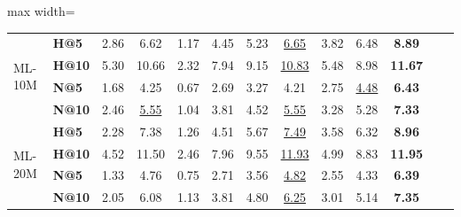\documentclass[sigconf,nonacm]{acmart}
\begin{document}
\begin{table}[htbp]
\begin{adjustbox}{max width=\textwidth}
\begin{tabular}{llccccccccccc}
\multirow{4}{*}{ML-10M}

& \textbf{H@5}     & 2.86  & 6.62  & 1.17  & 4.45  & 5.23  & \underline{6.65}  & 3.82  & 6.48 & \textbf{8.89} \\
& \textbf{H@10}    & 5.30  & 10.66 & 2.32  & 7.94  & 9.15  & \underline{10.83} & 5.48  & 8.98 & \textbf{11.67} \\
& \textbf{N@5}     & 1.68  & 4.25  & 0.67  & 2.69  & 3.27  & 4.21  & 2.75  & \underline{4.48} & \textbf{6.43} \\
& \textbf{N@10}    & 2.46  & \underline{5.55}  & 1.04  & 3.81  & 4.52  & \underline{5.55}  & 3.28  & 5.28 & \textbf{7.33} \\
\midrule

\multirow{4}{*}{ML-20M}

& \textbf{H@5}     & 2.28  & 7.38  & 1.26  & 4.51  & 5.67  & \underline{7.49}  & 3.58 & 6.32  & \textbf{8.96} \\
& \textbf{H@10}    & 4.52  & 11.50 & 2.46  & 7.96  & 9.55  & \underline{11.93} & 4.99 & 8.83  & \textbf{11.95} \\
& \textbf{N@5}     & 1.33  & 4.76  & 0.75  & 2.71  & 3.56  & \underline{4.82}  & 2.55 & 4.33  & \textbf{6.39} \\
& \textbf{N@10}    & 2.05  & 6.08  & 1.13  & 3.81  & 4.80  & \underline{6.25}  & 3.01 & 5.14  & \textbf{7.35} \\

\bottomrule
\end{tabular}
\end{adjustbox}
\end{table}
\end{document}
